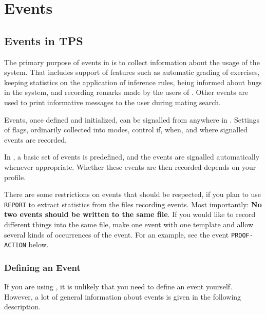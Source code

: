 \chapter{Events}
\label{events}



\section{Events in TPS}


The primary purpose of events in {\TPS} is to collect information about
the usage of the system.  That includes support of features such as
automatic grading of exercises, keeping statistics on the application of
inference rules, being informed about bugs in the system,
and recording remarks made by the users of {\TPS}.  Other events are
used to print informative messages to the user during mating search.

Events, once defined and initialized, can be signalled from anywhere in
{\TPS}.  Settings of flags, ordinarily collected into modes, control if,
when, and where signalled events are recorded.

In {\ETPS}, a basic set of events is predefined, and the events are signalled
automatically whenever appropriate.  Whether these events are then recorded
depends on your {\ETPS} profile.

There are some restrictions on events that should be respected, if
you plan to use {\tt REPORT} to extract statistics from the files recording
events.  Most importantly: {\bf No two events should be written to the
same file}.  If you would like to record different things into the
same file, make one event with one template and allow several kinds of
occurrences of the event.  For an example, see the event {\tt PROOF-ACTION}
below.

\subsection{Defining an Event}

If you are using {\ETPS}, it is unlikely that you need to define an event
yourself.  However, a lot of general information about events is given
in the following description.

